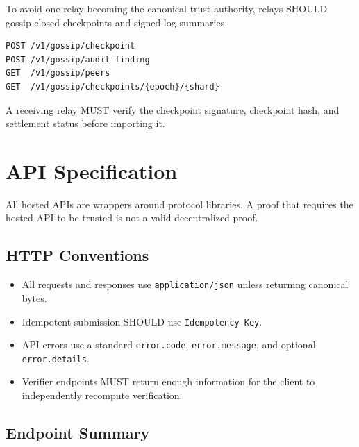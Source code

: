 \documentclass[11pt]{article}
\begin{document}
To avoid one relay becoming the canonical trust authority, relays SHOULD gossip closed checkpoints and signed log summaries.

\begin{lstlisting}[style=tslcode]
POST /v1/gossip/checkpoint
POST /v1/gossip/audit-finding
GET  /v1/gossip/peers
GET  /v1/gossip/checkpoints/{epoch}/{shard}
\end{lstlisting}

A receiving relay MUST verify the checkpoint signature, checkpoint hash, and settlement status before importing it.

\section{API Specification}

All hosted APIs are wrappers around protocol libraries. A proof that requires the hosted API to be trusted is not a valid decentralized proof.

\subsection{HTTP Conventions}

\begin{itemize}
    \item All requests and responses use \texttt{application/json} unless returning canonical bytes.
    \item Idempotent submission SHOULD use \texttt{Idempotency-Key}.
    \item API errors use a standard \texttt{error.code}, \texttt{error.message}, and optional \texttt{error.details}.
    \item Verifier endpoints MUST return enough information for the client to independently recompute verification.
\end{itemize}


\subsection{Endpoint Summary}
\end{document}
